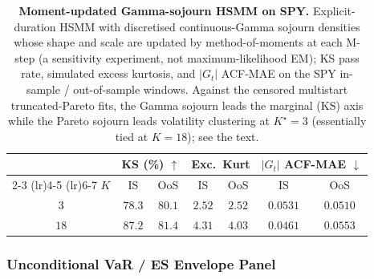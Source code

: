 \begin{table}[H]
\centering
\small
\caption{\textbf{Moment-updated Gamma-sojourn HSMM on SPY.} Explicit-duration HSMM with discretised continuous-Gamma sojourn densities whose shape and scale are updated by method-of-moments at each M-step (a sensitivity experiment, not maximum-likelihood EM); KS pass rate, simulated excess kurtosis, and $|G_t|$ ACF-MAE on the SPY in-sample / out-of-sample windows. Against the censored multistart truncated-Pareto fits, the Gamma sojourn leads the marginal (KS) axis while the Pareto sojourn leads volatility clustering at $K^\star = 3$ (essentially tied at $K = 18$); see the text.}
\label{tab:hsmm_gamma}
\begin{tabular}{c cc cc cc}
\toprule
& \multicolumn{2}{c}{KS (\%) $\uparrow$} & \multicolumn{2}{c}{Exc.\ Kurt} & \multicolumn{2}{c}{$|G_t|$ ACF-MAE $\downarrow$} \\
\cmidrule(lr){2-3} \cmidrule(lr){4-5} \cmidrule(lr){6-7}
$K$ & IS & OoS & IS & OoS & IS & OoS \\
\midrule
$3$  & $78.3$ & $80.1$ & $2.52$ & $2.52$ & $0.0531$ & $0.0510$ \\
$18$ & $87.2$ & $81.4$ & $4.31$ & $4.03$ & $0.0461$ & $0.0553$ \\
\bottomrule
\end{tabular}
\end{table}

\subsubsection{Unconditional VaR / ES Envelope Panel}
\label{sec:supp_var_envelope}

